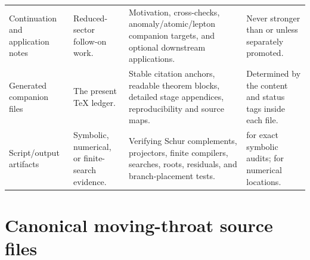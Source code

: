 \begin{longtable}{@{}L{0.14\textwidth}L{0.22\textwidth}L{0.39\textwidth}L{0.18\textwidth}@{}}
\addlinespace
Continuation and application notes & Reduced-sector follow-on work. & Motivation, cross-checks, anomaly/atomic/lepton companion targets, and optional downstream applications. & Never stronger than \StatusReduced{} or \StatusExactClosure{} unless separately promoted. \\
\addlinespace
Generated companion files & The present \TeX{} ledger. & Stable citation anchors, readable theorem blocks, detailed stage appendices, reproducibility and source maps. & Determined by the content and status tags inside each file. \\
\addlinespace
Script/output artifacts & Symbolic, numerical, or finite-search evidence. & Verifying Schur complements, projectors, finite compilers, searches, roots, residuals, and branch-placement tests. & \StatusExactClosure{} for exact symbolic audits; \StatusNumerical{} for numerical locations. \\
\bottomrule
\end{longtable}

\section{Canonical moving-throat source files}
\label{sec:canonical-moving-throat-source-files}

